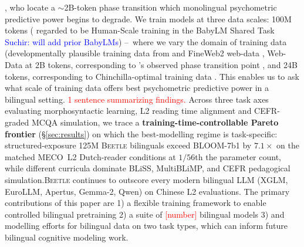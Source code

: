 \documentclass[11pt]{article}
\newcommand{\suchir}[1]{\textcolor{blue}{Suchir: #1}}
\begin{document}
\citet{aoyama-wilcox-2025-language}, who locate a $\sim$2B-token phase transition which monolingual psychometric predictive power begins to degrade. We train models at three data scales: 100M tokens ( regarded to be Human-Scale training in the BabyLM Shared Task \citep{choshen2026babylm} \suchir{will add prior BabyLMs}) – where we vary the domain of training data (developmentally plausible training data from \citet{jumelet2025babybabellmmultilingualbenchmarkdevelopmentally} and FineWeb2 web-data \citep{penedo2025fineweb2},  Web-Data at 2B tokens, corresponding to \citet{aoyama-wilcox-2025-language}'s observed phase transition point , and 24B tokens, corresponding to Chinchilla-optimal training data \citep{hoffmann2022}. This enables us to ask what scale of training data offers best psychometric predictive power in a bilingual setting. \textcolor{red}{1 sentence summarizing findings.} Across three task axes evaluating morphosyntactic learning, L2 reading time alignment and  CEFR-graded MCQA simulation, we trace a \textbf{training-time-controllable Pareto frontier} (\S\ref{sec:results}) on which the best-modelling regime is task-specific: structured-exposure 125M \textsc{Beetle} bilinguals exceed BLOOM-7b1 by $7.1\times$ on the matched MECO~L2 Dutch-reader conditions at $1/56$th the parameter count, while different curricula dominate BLiSS, MultiBLiMP, and CEFR pedagogical simulation.\textsc{Beetle} continues to outscore every modern bilingual LLM (XGLM, EuroLLM, Apertus, Gemma-2, Qwen) on Chinese L2 evaluations. The primary contributions of this paper are 1) a flexible training framework to enable controlled bilingual pretraining 2) a suite of \textcolor{red}{[number]} bilingual models 3) and modelling efforts for bilingual data on two task types, which can inform future bilingual cognitive modeling work.
\end{document}
